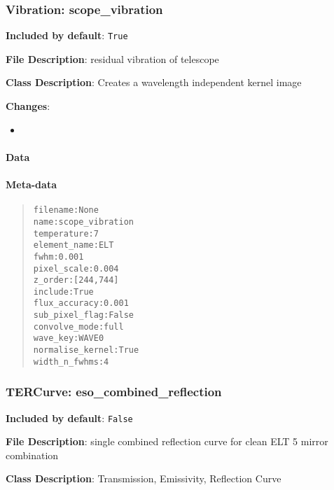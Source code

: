 \subsubsection{Vibration: \textquotedbl{}scope\_vibration\textquotedbl{}%
  \label{vibration-scope-vibration}%
}

\textbf{Included by default}: \texttt{True}

\textbf{File Description}: residual vibration of telescope

\textbf{Class Description}: Creates a wavelength independent kernel image

\textbf{Changes}:

\begin{itemize}
\item \end{itemize}


\paragraph{Data%
  \label{id1}%
}


\paragraph{Meta-data%
  \label{id2}%
}

\begin{quote}
\begin{alltt}
        filename : None
            name : scope_vibration
     temperature : 7
    element_name : ELT
            fwhm : 0.001
     pixel_scale : 0.004
         z_order : [244, 744]
         include : True
   flux_accuracy : 0.001
  sub_pixel_flag : False
   convolve_mode : full
        wave_key : WAVE0
normalise_kernel : True
   width_n_fwhms : 4
\end{alltt}
\end{quote}


\subsubsection{TERCurve: \textquotedbl{}eso\_combined\_reflection\textquotedbl{}%
  \label{tercurve-eso-combined-reflection}%
}

\textbf{Included by default}: \texttt{False}

\textbf{File Description}: single combined reflection curve for clean ELT 5 mirror combination

\textbf{Class Description}: Transmission, Emissivity, Reflection Curve

